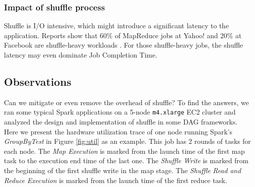 
\subsubsection{Impact of shuffle process}
{\color{blue}
Shuffle is I/O intensive, which might introduce a significant latency to the application. 
Reports show that $60\%$ of MapReduce jobs at Yahoo! and $20\%$ at Facebook are shuffle-heavy workloads \cite{shufflewatcher}. 
For those shuffle-heavy jobs, the shuffle latency may even dominate Job Completion Time.
}

\subsection{Observations} \label{observation}
Can we mitigate or even remove the overhead of shuffle? 
To find the answers, we ran some typical Spark applications on a 5-node \texttt{m4.xlarge} EC2 cluster and analyzed the design and implementation of shuffle in some DAG frameworks.
Here we present the hardware utilization trace of one node running Spark's \textit{GroupByTest} in Figure \ref{fig:util} as an example. 
This job has 2 rounds of tasks for each node.
The \textit{Map Execution} is marked from the launch time of the first map task to the execution end time of the last one. 
The \textit{Shuffle Write} is marked from the beginning of the first shuffle write in the map stage. 
The \textit{Shuffle Read and Reduce Execution} is marked from the launch time of the first reduce task.
